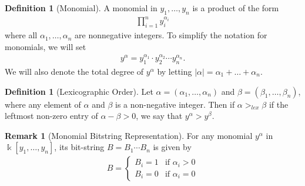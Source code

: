 \documentclass[12pt,reqno]{amsart}
\theoremstyle{plain}
\theoremstyle{definition}
\newtheorem{remark}[theorem]{Remark}
\newtheorem{definition}[theorem]{Definition}
\def\field{\Bbbk}
\begin{document}
\begin{definition}[Monomial]
	A monomial in $y_1, \dots, y_n$ is a product of the form
	\begin{align*}
		\prod_{i=1}^{n} y_{i}^{\alpha_{i}}
	\end{align*}
	where all $\alpha_1, \dots, \alpha_n$ are nonnegative integers. To simplify the notation for monomials,
	we will set 
	\begin{align*}
		y^{\alpha} = y_{1}^{\alpha_{1}} \cdot y_{2}^{\alpha_{2}} \cdots y_{n}^{\alpha_{n}}.
	\end{align*}
	We will also denote the total degree of $y^{\alpha}$ by letting $|\alpha| = \alpha_1 + \dots + \alpha_n$.
\end{definition}

\begin{definition}[Lexicographic Order]
	Let $\alpha = (\alpha_1, \dots, \alpha_n)$ and $\beta = (\beta_1, \dots, \beta_n)$, where any element of
	$\alpha$ and $\beta$ is a non-negative integer. Then if $\alpha >_{lex} \beta$ if the leftmost non-zero entry of $\alpha - \beta > 0$, we say that $y^{\alpha} > y^{\beta}$.
\end{definition}

\begin{remark}[Monomial Bitstring Representation] 
	For any monomial $y^\alpha$ in $\field[y_1, \dots, y_n]$, its bit-string $B = B_1 \cdots B_n$ is given by 
	\begin{align*}
		B = \begin{cases}
			B_i = 1 & \text{if } \alpha_i > 0 \\
			B_i = 0 & \text{if } \alpha_i = 0
		\end{cases} 
	\end{align*}
\end{remark}
\end{document}
